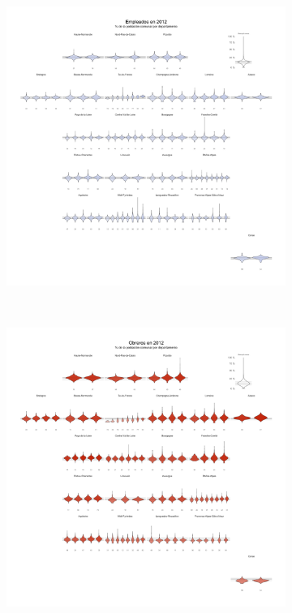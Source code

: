 \begin{figure}
\begin{subfigure}{0.235\textwidth}
	\end{subfigure}
	~
	\begin{subfigure}{0.235\textwidth}
	\includegraphics[width = \textwidth]{Figs/AED/Geofacet_Distr_por_Dpto_CSP5_2012}
	\end{subfigure}
	~
	\begin{subfigure}{0.235\textwidth}
	\includegraphics[width = \textwidth]{Figs/AED/Geofacet_Distr_por_Dpto_CSP6_2012}

\end{subfigure}
\end{figure}
